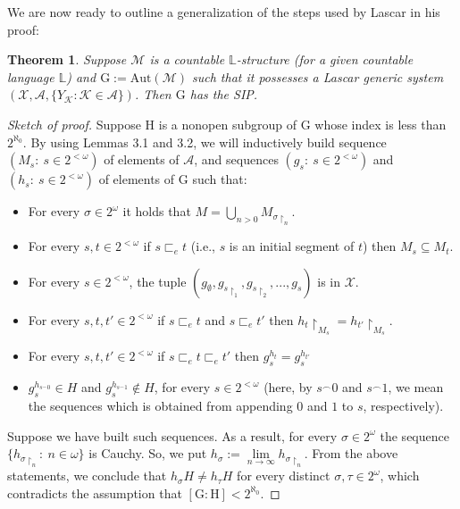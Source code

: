 \documentclass[11pt]{article}
\newtheorem{theorem}{Theorem}[section]
\theoremstyle{plain}
\theoremstyle{definition}
\newcommand{\M}{\mathcal{M}}
\newcommand{\K}{\mathcal{K}}
\newcommand{\G}{\mathrm{G}}
\newcommand{\A}{\mathrm{Aut}}
\begin{document}
We are now ready to outline a generalization of the steps used by Lascar in his proof:
\begin{theorem}
	Suppose $\M$ is a countable $\mathbb{L}$-structure (for a given countable language $\mathbb{L}$) and $\G:=\A(\M)$ such that it possesses a Lascar generic system $(\mathcal{X},\mathcal{A},\{Y_{\K}: \K\in\mathcal{A}\})$. Then $\G$ has the SIP.
\end{theorem}
\begin{proof}[Sketch of proof]
 Suppose $\mathrm{H}$	is a nonopen subgroup of $\G$ whose index is less than $2^{\aleph_{0}}$.  By using Lemmas 3.1 and 3.2, we will inductively build  sequence $(M_{s}: \ s\in 2^{<\omega})$ of elements of $\mathcal{A}$, and sequences $(g_{s}: \ s\in 2^{<\omega})$ and $(h_{s}: \ s\in 2^{<\omega})$ of elements of $\G$ such that:
\begin{itemize}
\item[(1)] For every $\sigma\in 2^{\omega}$ it holds that $M=\bigcup_{n>0}M_{\sigma\upharpoonright_{n}}$.
\item[(2)] For every $s,t\in 2^{<\omega}$ if $s\sqsubset_{e} t$ (i.e., $s$ is an initial segment of $t$) then $M_{s}\subseteq M_{t}$.
\item[(3)] For every  $s\in 2^{<\omega}$, the tuple $(g_{\emptyset},g_{s\upharpoonright_{1}},g_{s\upharpoonright_{2}},...,g_{s})$ is in $\mathcal{X} $.
\item[(4)] For every $s,t,t'\in 2^{<\omega}$ if $s\sqsubset_{e} t$  and $s\sqsubset_{e} t'$ then $h_{t}\upharpoonright_{M_{s}}=h_{t'}\upharpoonright_{M_{s}}$.
\item[(5)] For every $s,t,t'\in 2^{<\omega}$ if $s\sqsubset_{e} t\sqsubset_{e} t'$  then $g_{s}^{h_{t}}=g_{s}^{h_{t'}}$
\item[(6)] $g_{s}^{h_{s^{\smallfrown}0}}\in H$ and $g_{s}^{h_{s^{\smallfrown}1}}\notin H$, for every $s\in 2^{<\omega}$ (here, by $ s^{\smallfrown}0$ and $s^{\smallfrown}1$, we mean the sequences which is obtained from appending $0$ and $1$ to $s$, respectively).
\end{itemize}
Suppose we have built such sequences. As a result, for every $\sigma\in 2^{\omega}$ the sequence $\{h_{\sigma\upharpoonright_{n}}: \ n\in\omega\}$ is Cauchy. So, we put ${h_{\sigma}:=\lim\limits_{n\rightarrow\infty}h_{\sigma\upharpoonright_{n}}}$. From the above statements, we conclude that $h_{\sigma}H\neq h_{\tau}H$ for every distinct $\sigma,\tau\in 2^{\omega}$, which contradicts the assumption that $[\G:\mathrm{H}]<2^{\aleph_{0}}$.


\end{proof}
\end{document}
